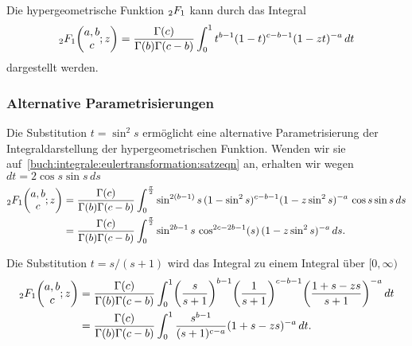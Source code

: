 \begin{satz}[Euler]
%
\label{buch:integrale:eulertransformation:satz}
Die hypergeometrische Funktion $\mathstrut_2F_1$ kann durch das 
Integral
\begin{equation}
\mathstrut_2F_1\biggl(\begin{matrix}a,b\\c\end{matrix};z\biggr)
=
\frac{\Gamma(c)}{\Gamma(b)\Gamma(c-b)}
\int_0^1
t^{b-1}(1-t)^{c-b-1}(1-zt)^{-a}
\,dt
\label{buch:integrale:eulertransformation:satzeqn}
\end{equation}
dargestellt werden.
\end{satz}

%
%
\subsubsection{Alternative Parametrisierungen}
Die Substitution $t=\sin^2 s$ ermöglicht eine alternative Parametrisierung
der Integraldarstellung der hypergeometrischen Funktion.
Wenden wir sie auf~\eqref{buch:integrale:eulertransformation:satzeqn}
an, erhalten wir wegen $dt = 2\cos s\sin s\,ds$
\begin{align*}
\mathstrut_2F_1\biggl(\begin{matrix}a,b\\c\end{matrix};z\biggr)
&=
\frac{\Gamma(c)}{\Gamma(b)\Gamma(c-b)}
\int_0^{\frac{\pi}2}
\sin^{2(b-1)}s\,
(1-\sin^2s)^{c-b-1} (1-z\sin^2 s)^{-a}
\,\cos s\sin s
\,ds
\\
&=
\frac{\Gamma(c)}{\Gamma(b)\Gamma(c-b)}
\int_0^{\frac{\pi}2}
\sin^{2b-1}s\,\cos^{2c-2b-1}(s)\, (1-z\sin^2 s)^{-a}
\,ds.
\end{align*}

Die Substitution $t=s/(s+1)$ wird das Integral zu einem Integral
über $[0,\infty)$
\begin{align*}
\mathstrut_2F_1\biggl(\begin{matrix}a,b\\c\end{matrix};z\biggr)
&=
\frac{\Gamma(c)}{\Gamma(b)\Gamma(c-b)}
\int_0^1
\biggl(\frac{s}{s+1}\biggr)^{b-1}
\biggl(\frac{1}{s+1}\biggr)^{c-b-1}
\biggl(\frac{1+s-zs}{s+1}\biggr)^{-a}
\,dt
\\
&=
\frac{\Gamma(c)}{\Gamma(b)\Gamma(c-b)}
\int_0^1
\frac{
s^{b-1}
}{
(s+1)^{c-a}
}
(1+s-zs)^{-a}
\,dt.
\end{align*}

